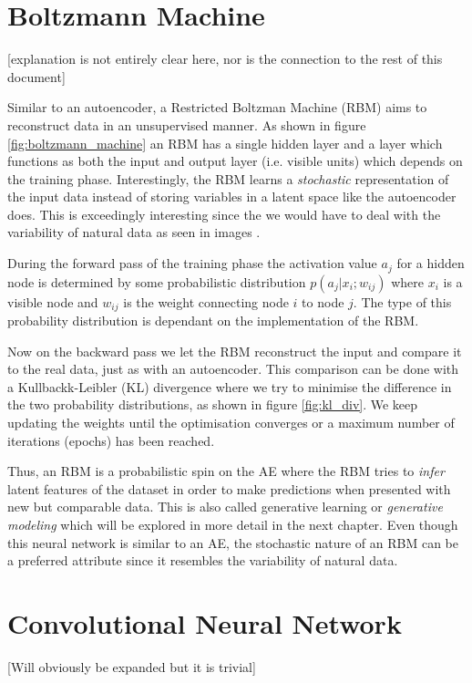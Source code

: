 \documentclass[main.tex]{subfiles}
\begin{document}
\section{Boltzmann Machine}
[explanation is not entirely clear here, nor is the connection to the rest of this document]

Similar to an autoencoder, a Restricted Boltzman Machine (RBM) aims to reconstruct data in an unsupervised manner. As shown in figure \ref{fig:boltzmann_machine} an RBM has a single hidden layer and a layer which functions as both the input and output layer (i.e. visible units) which depends on the training phase. Interestingly, the RBM learns a \textit{stochastic} representation of the input data instead of storing variables in a latent space like the autoencoder does. This is exceedingly interesting since the we would have to deal with the variability of natural data as seen in images \cite{chen2003continuous}. 

During the forward pass of the training phase the activation value $a_j$ for a hidden node is determined by some probabilistic distribution $p(a_j|x_i;w_{ij})$ where $x_i$ is a visible node and $w_{ij}$ is the weight connecting node $i$ to node $j$. The type of this probability distribution is dependant on the implementation of the RBM. 

Now on the backward pass we let the RBM reconstruct the input and compare it to the real data, just as with an autoencoder. This comparison can be done with a Kullbackk-Leibler (KL) divergence where we try to minimise the difference in the two probability distributions, as shown in figure \ref{fig:kl_div}. We keep updating the weights until the optimisation converges or a maximum number of iterations (epochs) has been reached.

Thus, an RBM is a probabilistic spin on the AE where the RBM tries to \textit{infer} latent features of the dataset in order to make predictions when presented with new but comparable data. This is also called generative learning or \textit{generative modeling} which will be explored in more detail in the next chapter. Even though this neural network is similar to an AE, the stochastic nature of an RBM can be a preferred attribute since it resembles the variability of natural data.

\section{Convolutional Neural Network}
[Will obviously be expanded but it is trivial]
\end{document}

